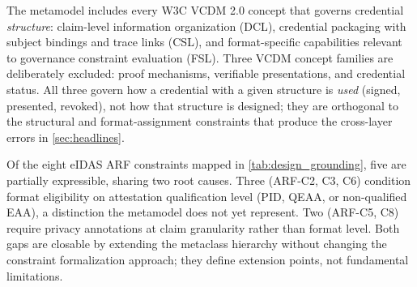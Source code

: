 The metamodel includes every W3C VCDM 2.0 concept that governs credential \emph{structure}: claim-level information organization (\ac{DCL}), credential packaging with subject bindings and trace links (\ac{CSL}), and format-specific capabilities relevant to governance constraint evaluation (\ac{FSL}). Three VCDM concept families are deliberately excluded: proof mechanisms, verifiable presentations, and credential status. All three govern how a credential with a given structure is \emph{used} (signed, presented, revoked), not how that structure is designed; they are orthogonal to the structural and format-assignment constraints that produce the cross-layer errors in \autoref{sec:headlines}.

Of the eight eIDAS \ac{ARF} constraints mapped in \autoref{tab:design_grounding}, five are partially expressible, sharing two root causes. Three (ARF-C2, C3, C6) condition format eligibility on attestation qualification level (PID, QEAA, or non-qualified EAA), a distinction the metamodel does not yet represent. Two (ARF-C5, C8) require privacy annotations at claim granularity rather than format level. Both gaps are closable by extending the metaclass hierarchy without changing the constraint formalization approach; they define extension points, not fundamental limitations.
